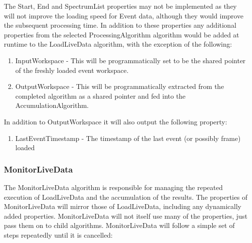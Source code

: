 The Start, End and SpectrumList properties may not be implemented as they will not improve the loading speed for Event data, although they would improve the subsequent processing time.
In addition to these properties any additional properties from the selected ProcessingAlgorithm algorithm would be added at runtime to the LoadLiveData algorithm, with the exception of the following:
\begin{enumerate}
\item InputWorkspace - This will be programmatically set to be the shared pointer of the freshly loaded event workspace.
\item OutputWorkspace - This will be programmatically extracted from the completed algorithm as a shared pointer and fed into the AccumulationAlgorithm.
\end{enumerate}

In addition to OutputWorkspace it will also output the following property:
\begin{enumerate}
\item LastEventTimestamp - The timestamp of the last event (or possibly frame) loaded
\end{enumerate}


\subsubsection{MonitorLiveData}

The MonitorLiveData algorithm is responsible for managing the repeated execution of LoadLiveData and the accumulation of the results.  The properties of MonitorLiveData will mirror those of LoadLiveData, including any dynamically added properties.  MonitorLiveData will not itself use many of the properties, just pass them on to child algorithms.  MonitorLiveData will follow a simple set of steps repeatedly until it is cancelled:


